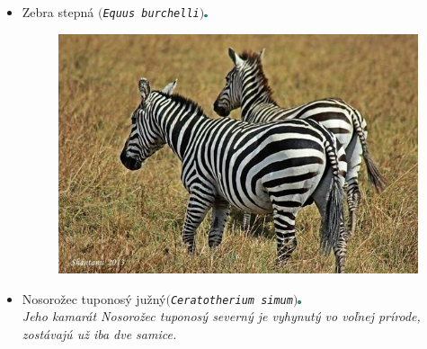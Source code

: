 \documentclass{article}
\begin{document}
\begin{itemize}
\item Zebra stepná $($\texttt{\textit{Equus burchelli}}$)$\includegraphics[width=0.007\textwidth,natwidth=200,natheight=200]{LC.png}\\
\vskip 10mm
\begin{figure}[h]

\includegraphics[scale=0.005]{zebra-masai.jpg}
\end{figure}

\item Nosorožec tuponosý južný$($\texttt{\textit{Ceratotherium simum}}$)$\includegraphics[width=0.007\textwidth,natwidth=200,natheight=200]{NT.png}\\
\textit{Jeho kamarát Nosorožec tuponosý severný je vyhynutý vo voľnej prírode, zostávajú už iba dve samice.}
\vskip 0.653in
\begin{figure}[h]


\end{figure}
\end{itemize}
\end{document}
